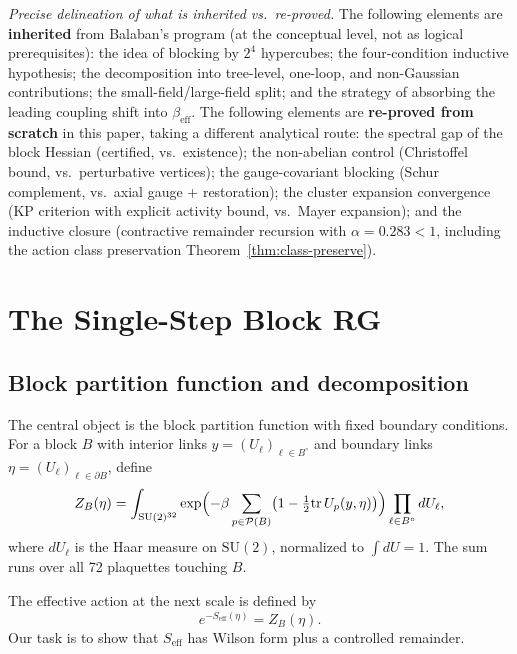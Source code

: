 \documentclass[11pt]{article}
\theoremstyle{definition}
\newcommand{\SU}{\mathrm{SU}}
\newcommand{\tr}{\mathrm{tr}}
\begin{document}
\emph{Precise delineation of what is inherited vs.\ re-proved.}
The following elements are \textbf{inherited} from Balaban's program
(at the conceptual level, not as logical prerequisites):
the idea of blocking by $2^4$ hypercubes; the four-condition
inductive hypothesis; the decomposition into tree-level, one-loop,
and non-Gaussian contributions; the small-field/large-field split;
and the strategy of absorbing the leading coupling shift into
$\beta_{\mathrm{eff}}$.
The following elements are \textbf{re-proved from scratch} in this paper,
taking a different analytical route:
the spectral gap of the block Hessian (certified, vs.\ existence);
the non-abelian control (Christoffel bound, vs.\ perturbative vertices);
the gauge-covariant blocking (Schur complement, vs.\ axial gauge +
restoration); the cluster expansion convergence (KP criterion
with explicit activity bound, vs.\ Mayer expansion); and the
inductive closure (contractive remainder recursion with
$\alpha=0.283<1$, including the action class preservation
Theorem~\ref{thm:class-preserve}).

\section{The Single-Step Block RG}\label{sec:singlestep}

\subsection{Block partition function and decomposition}\label{subsec:blockZ}

The central object is the block partition function with fixed boundary
conditions.  For a block $B$ with interior links $y=(U_\ell)_{\ell\in B^\circ}$
and boundary links $\eta=(U_\ell)_{\ell\in\partial B}$, define
\begin{equation}\label{eq:blockZ}
Z_B(\eta)=\int_{\SU(2)^{32}}\exp\Bigl(-\beta
\sum_{p\in\mathcal{P}(B)}\bigl(1-\tfrac{1}{2}\tr\,U_p(y,\eta)\bigr)
\Bigr)\prod_{\ell\in B^\circ}dU_\ell,
\end{equation}
where $dU_\ell$ is the Haar measure on $\SU(2)$, normalized to
$\int dU=1$.  The sum runs over all 72 plaquettes touching $B$.

The effective action at the next scale is defined by
\begin{equation}\label{eq:Seff-def}
e^{-S_{\mathrm{eff}}(\eta)}=Z_B(\eta).
\end{equation}
Our task is to show that $S_{\mathrm{eff}}$ has Wilson form plus
a controlled remainder.
\end{document}

